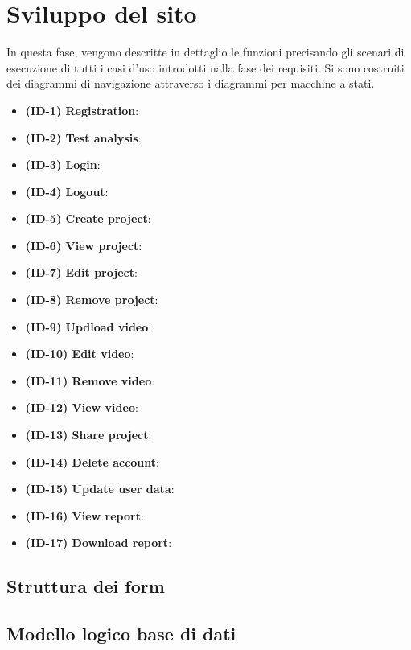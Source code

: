 
\chapter{Sviluppo del sito}\label{chap:sviluppo-sito}
In questa fase, vengono descritte in dettaglio le funzioni precisando gli 
scenari di esecuzione di tutti i casi d'uso introdotti nalla fase dei 
requisiti. Si sono costruiti dei diagrammi di navigazione attraverso i 
diagrammi per macchine a stati. 

\begin{itemize}
	\item \textbf{(ID-1) Registration}:
	\item \textbf{(ID-2) Test analysis}:
	\item \textbf{(ID-3) Login}:
	\item \textbf{(ID-4) Logout}:
	\item \textbf{(ID-5) Create project}:
	\item \textbf{(ID-6) View project}:
	\item \textbf{(ID-7) Edit project}:
	\item \textbf{(ID-8) Remove project}:
	\item \textbf{(ID-9) Updload video}:
	\item \textbf{(ID-10) Edit video}:
	\item \textbf{(ID-11) Remove video}:
	\item \textbf{(ID-12) View video}:
	\item \textbf{(ID-13) Share project}:
	\item \textbf{(ID-14) Delete account}:
	\item \textbf{(ID-15) Update user data}:
	\item \textbf{(ID-16) View report}:
	\item \textbf{(ID-17) Download report}:
	
\end{itemize}

\section{Struttura dei form}\label{sec:struttura-form}

\section{Modello logico base di dati}\label{sec:modello-logico}



